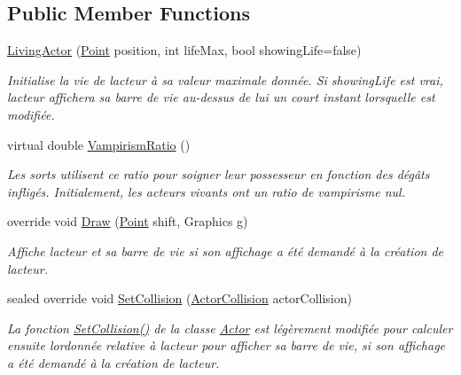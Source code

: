 \subsection*{Public Member Functions}
\begin{DoxyCompactItemize}
\item 
\hyperlink{class_tentacle_slicers_1_1actors_1_1_living_actor_ad5c2bea3a216b8b7aba0aa65e1c72e56}{Living\+Actor} (\hyperlink{class_tentacle_slicers_1_1general_1_1_point}{Point} position, int life\+Max, bool showing\+Life=false)
\begin{DoxyCompactList}\small\item\em Initialise la vie de l\textquotesingle{}acteur à sa valeur maximale donnée. Si showing\+Life est vrai, l\textquotesingle{}acteur affichera sa barre de vie au-\/dessus de lui un court instant lorsqu\textquotesingle{}elle est modifiée. \end{DoxyCompactList}\item 
virtual double \hyperlink{class_tentacle_slicers_1_1actors_1_1_living_actor_a7a3b86dc36055bcbe1838dd3df0c9274}{Vampirism\+Ratio} ()
\begin{DoxyCompactList}\small\item\em Les sorts utilisent ce ratio pour soigner leur possesseur en fonction des dégâts infligés. Initialement, les acteurs vivants ont un ratio de vampirisme nul. \end{DoxyCompactList}\item 
override void \hyperlink{class_tentacle_slicers_1_1actors_1_1_living_actor_a9b8adc982e25895a4509c870f784b5f1}{Draw} (\hyperlink{class_tentacle_slicers_1_1general_1_1_point}{Point} shift, Graphics g)
\begin{DoxyCompactList}\small\item\em Affiche l\textquotesingle{}acteur et sa barre de vie si son affichage a été demandé à la création de l\textquotesingle{}acteur. \end{DoxyCompactList}\item 
sealed override void \hyperlink{class_tentacle_slicers_1_1actors_1_1_living_actor_ac5f070aa8e36c2815070a654a242b9ef}{Set\+Collision} (\hyperlink{class_tentacle_slicers_1_1collisions_1_1_actor_collision}{Actor\+Collision} actor\+Collision)
\begin{DoxyCompactList}\small\item\em La fonction \hyperlink{class_tentacle_slicers_1_1actors_1_1_living_actor_ac5f070aa8e36c2815070a654a242b9ef}{Set\+Collision()} de la classe \hyperlink{class_tentacle_slicers_1_1actors_1_1_actor}{Actor} est légèrement modifiée pour calculer ensuite l\textquotesingle{}ordonnée relative à l\textquotesingle{}acteur pour afficher sa barre de vie, si son affichage a été demandé à la création de l\textquotesingle{}acteur. \end{DoxyCompactList}\item 

\end{DoxyCompactItemize}
